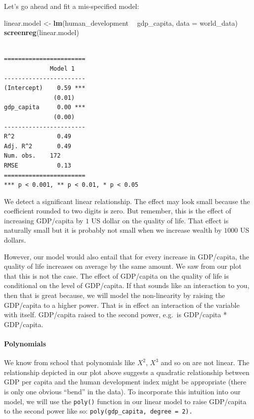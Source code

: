 \documentclass[]{article}
\newenvironment{Shaded}{\begin{snugshade}}{\end{snugshade}}
\newcommand{\DataTypeTok}[1]{\textcolor[rgb]{0.13,0.29,0.53}{#1}}
\newcommand{\KeywordTok}[1]{\textcolor[rgb]{0.13,0.29,0.53}{\textbf{#1}}}
\newcommand{\NormalTok}[1]{#1}
\newcommand{\OperatorTok}[1]{\textcolor[rgb]{0.81,0.36,0.00}{\textbf{#1}}}
\newcommand{\StringTok}[1]{\textcolor[rgb]{0.31,0.60,0.02}{#1}}
\let\oldparagraph\paragraph
\renewcommand{\paragraph}[1]{\oldparagraph{#1}\mbox{}}
\begin{document}
Let's go ahead and fit a mis-specified model:

\begin{Shaded}
\begin{Highlighting}[]
\NormalTok{linear.model <-}\StringTok{ }\KeywordTok{lm}\NormalTok{(human_development }\OperatorTok{~}\StringTok{ }\NormalTok{gdp_capita, }\DataTypeTok{data =}\NormalTok{ world_data)}
\KeywordTok{screenreg}\NormalTok{(linear.model)}
\end{Highlighting}
\end{Shaded}

\begin{verbatim}

=======================
             Model 1   
-----------------------
(Intercept)    0.59 ***
              (0.01)   
gdp_capita     0.00 ***
              (0.00)   
-----------------------
R^2            0.49    
Adj. R^2       0.49    
Num. obs.    172       
RMSE           0.13    
=======================
*** p < 0.001, ** p < 0.01, * p < 0.05
\end{verbatim}

We detect a significant linear relationship. The effect may look small because the coefficient rounded to two digits is zero. But remember, this is the effect of increasing GDP/capita by \(1\) US dollar on the quality of life. That effect is naturally small but it is probably not small when we increase wealth by \(1000\) US dollars.

However, our model would also entail that for every increase in GDP/capita, the quality of life increases on average by the same amount. We saw from our plot that this is not the case. The effect of GDP/capita on the quality of life is conditional on the level of GDP/capita. If that sounds like an interaction to you, then that is great because, we will model the non-linearity by raising the GDP/capita to a higher power. That is in effect an interaction of the variable with itself. GDP/capita raised to the second power, e.g.~is GDP/capita * GDP/capita.

\hypertarget{polynomials}{%
\paragraph{Polynomials}\label{polynomials}}

We know from school that polynomials like \(X^2\), \(X^3\) and so on are not linear. The relationship depicted in our plot above suggests a quadratic relationship between GDP per capita and the human development index might be appropriate (there is only one obvious ``bend'' in the data). To incorporate this intuition into our model, we will use the \texttt{poly()} function in our linear model to raise GDP/capita to the second power like so: \texttt{poly(gdp\_capita,\ degree\ =\ 2).}
\end{document}

